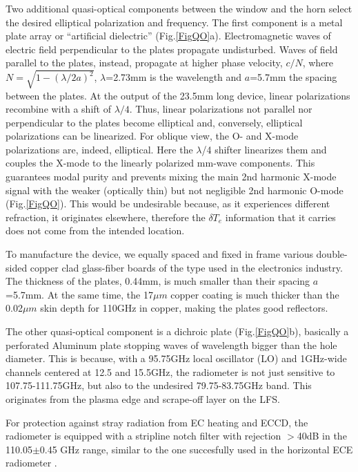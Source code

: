 \documentclass[aps,pra,twocolumn]{revtex4}
\begin{document}
Two additional quasi-optical components between the window and the horn select
the desired elliptical polarization and frequency. 
The first component is a metal plate array or ``artificial dielectric'' 
(Fig.\ref{FigQO}a). Electromagnetic waves of electric field
perpendicular to the plates propagate undisturbed. Waves of field parallel to
the plates, instead, propagate at higher phase velocity, $c/N$, where 
$N=\sqrt{1-(\lambda/2a)^2}$, $\lambda $=2.73mm is the wavelength and 
$a$=5.7mm the spacing between the plates. 
At the output of the 23.5mm long device,  
linear polarizations recombine with a shift of $\lambda/4$. 
Thus, linear polarizations not parallel nor perpendicular to the plates become
elliptical and, conversely, elliptical polarizations can be linearized. 
For oblique view, the O- and X-mode polarizations are, indeed, elliptical.  
Here the $\lambda$/4 shifter linearizes them and couples the X-mode to the
linearly polarized mm-wave components. This guarantees modal purity
and prevents mixing the main 2nd harmonic 
X-mode signal with the weaker (optically thin) but not negligible 
2nd harmonic O-mode (Fig.\ref{FigQO}).  
This would be undesirable because, as it 
experiences different refraction, it originates elsewhere, therefore the 
$\delta T_e$ information that it carries does not come from the intended 
location. 

To manufacture the device, we equally spaced and fixed in frame various 
double-sided copper clad glass-fiber boards of the type used in the
electronics industry. The thickness of the plates, 0.44mm, is much smaller
than their spacing $a$=5.7mm. At the same time, the 17$\mu m$ copper 
coating is much thicker than the 0.02$\mu m$ skin depth for 110GHz in 
copper, making the plates good reflectors. 

The other quasi-optical component is a dichroic plate (Fig.\ref{FigQO}b), 
basically a perforated Aluminum plate stopping waves of
wavelength bigger than the hole diameter. This is because, with a 95.75GHz 
local oscillator (LO) 
and 1GHz-wide channels centered at 12.5 and 15.5GHz, the radiometer is
not just sensitive to 107.75-111.75GHz, but also to the undesired 
79.75-83.75GHz band. This originates from the plasma edge and scrape-off
layer on the LFS.

For protection against stray radiation from EC heating and ECCD,
the radiometer is equipped with a stripline notch filter with rejection 
$>$40dB in the 110.05$\pm$0.45 GHz range, similar to the one
succesfully used in the horizontal ECE radiometer \cite{HorizRadiom}. 
\end{document}
